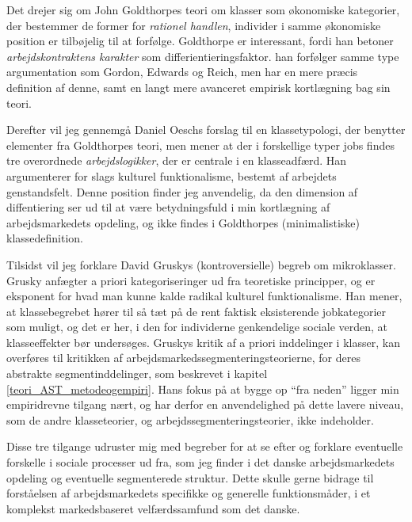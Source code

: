 Det drejer sig om John Goldthorpes teori om klasser som økonomiske kategorier, der bestemmer de former for \emph{rationel handlen}, individer i samme økonomiske position er tilbøjelig til at forfølge. Goldthorpe er interessant, fordi han betoner \emph{arbejdskontraktens karakter} som differientieringsfaktor. han forfølger samme type argumentation som Gordon, Edwards og Reich, men har en mere præcis definition af denne, samt en langt mere avanceret empirisk kortlægning bag sin teori.

Derefter vil jeg gennemgå Daniel Oeschs forslag til en klassetypologi, der benytter elementer fra Goldthorpes teori, men mener at der i forskellige typer jobs findes tre overordnede \emph{arbejdslogikker}, der er centrale i en klasseadfærd. Han argumenterer for slags kulturel funktionalisme, bestemt af arbejdets genstandsfelt. Denne position finder jeg anvendelig, da den dimension af diffentiering ser ud til at være betydningsfuld i min kortlægning af arbejdsmarkedets opdeling, og ikke findes i Goldthorpes (minimalistiske) klassedefinition.

Tilsidst vil jeg forklare David Gruskys (kontroversielle) begreb om mikroklasser. Grusky anfægter a priori kategoriseringer ud fra teoretiske principper, og er eksponent for hvad man kunne kalde radikal kulturel funktionalisme. Han mener, at klassebegrebet hører til så tæt på de rent faktisk eksisterende jobkategorier som muligt, og det er her, i den for individerne genkendelige sociale verden, at klasseeffekter bør undersøges. Gruskys kritik af a priori inddelinger i klasser, kan overføres til kritikken af arbejdsmarkedssegmenteringsteorierne, for deres abstrakte segmentinddelinger, som beskrevet i kapitel \ref{teori_AST_metodeogempiri}. Hans fokus på at bygge op “fra neden” ligger min empiridrevne tilgang nært, og har derfor en anvendelighed på dette lavere niveau, som de andre klasseteorier, og arbejdssegmenteringsteorier, ikke indeholder. 

Disse tre tilgange udruster mig med begreber for at se efter og forklare eventuelle forskelle i sociale processer ud fra, som jeg finder i det danske arbejdsmarkedets opdeling og eventuelle segmenterede struktur. Dette skulle gerne bidrage til forståelsen af arbejdsmarkedets specifikke og generelle funktionsmåder, i et komplekst markedsbaseret velfærdssamfund som det danske. 


